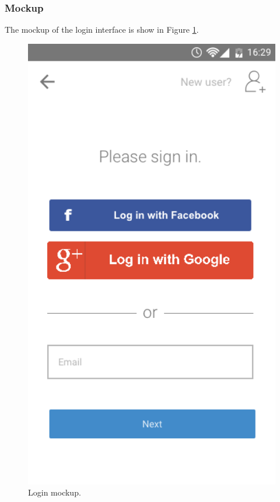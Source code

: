 \subsubsection{Mockup}
The mockup of the login interface is show in Figure \ref{fig:MockupLogin}.
\begin{figure}
	\centering
	\includegraphics[width=4.5in]{./images/login.png}
	\caption{Login mockup.}
	\label{fig:MockupLogin}
\end{figure}
